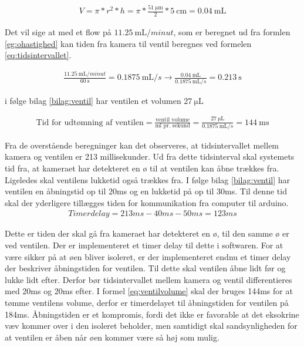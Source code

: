 \begin{align}
V=\pi*r^2*h=\pi*\frac{\SI{51}{\micro\metre}}{2}*\SI{5}{\centi\metre}=\SI{0,04}{\milli\liter}
\label{eg:slangevolume}
\end{align}

 Det vil sige at med et flow på $\SI{11,25}{\milli\liter/minut}$, som er beregnet ud fra formlen \ref{eg:ohastighed} kan tiden fra kamera til ventil beregnes ved formelen \ref{eq:tidsintervallet}. 
 
\begin{align}
\frac{\SI{11,25}{\milli\liter/minut}}{\SI{60}{\second}}=\SI{0,1875}{\milli\liter/s}\to\frac{\SI{0,04}{\milli\liter}}{\SI{0,1875}{\milli\liter/s}}=\SI{0.213}{\second}
\label{eq:tidsintervallet}
\end{align} 

i følge bilag \ref{bilag:ventil} har ventilen et volumen $\SI{27}{\micro\liter}$

\begin{align}
\text{Tid for udtømning af ventilen} = \frac{\text{ventil volume}}{\text{ml pr. sekund}}=\frac{\SI{27}{\micro\liter}}{\SI{0,1875}{\milli\liter/s}}=\SI{144}{\milli\second}
\label{eq:ventilvolume}
\end{align}

Fra de overstående beregninger kan det observeres, at tidsintervallet mellem kamera og ventilen er 213 millisekunder. Ud fra dette tidsinterval skal systemets tid fra, at kameraet har detekteret en ø til at ventilen kan åbne trækkes fra. Ligeledes skal ventilens lukketid også trækkes fra. I følge bilag \ref{bilag:ventil} har ventilen en åbningstid op til 20ms og en lukketid på op til 30ms. Til denne tid skal der yderligere tillægges tiden for kommunikation fra computer til arduino.
\begin{align}
Timerdelay=213ms-40ms-50ms=123ms
\label{eq:timerdelay}
\end{align} 

Dette er tiden der skal gå fra kameraet har detekteret en ø, til den samme ø er ved ventilen. Der er implementeret et timer delay til dette i softwaren. For at være sikker på at øen bliver isoleret, er der implementeret endnu et timer delay der beskriver åbningstiden for ventilen. Til dette skal ventilen åbne lidt før og lukke lidt efter. Derfor bør tidsintervallet mellem kamera og ventil differentieres med 20ms og 20ms efter. I formel \ref{eq:ventilvolume} skal der bruges 144ms for at tømme ventilens volume, derfor er timerdelayet til åbningstiden for ventilen på 184ms. 
Åbningstiden er et kompromis, fordi det ikke er favorable at det eksokrine væv kommer over i den isoleret beholder, men samtidigt skal sandsynligheden for at ventilen er åben når øen kommer være så høj som mulig.

